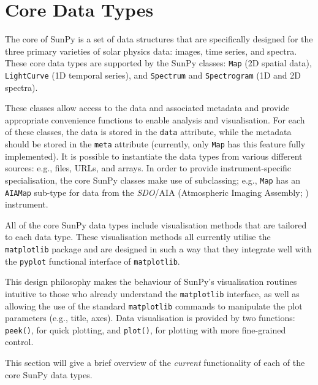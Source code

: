 \section{Core Data Types}\label{sec:DataTypes}

The core of SunPy is a set of data structures that are specifically designed for the
three primary varieties of solar physics data: images, time series, and
spectra. These core data types are supported by the SunPy classes:
\texttt{Map} (2D spatial data), \texttt{LightCurve} (1D temporal series),
and \texttt{Spectrum} and \texttt{Spectrogram} (1D and 2D spectra). 

These classes allow access to the data
and associated metadata and provide appropriate convenience functions to
enable analysis and visualisation. For each of these classes, the data is
stored in the \texttt{data} attribute, while the metadata should be stored 
in the \texttt{meta} attribute (currently, only \texttt{Map} has this feature 
fully implemented). 
It is possible to instantiate the
data types from various
different sources: e.g., files, URLs, and arrays.  
In order to provide instrument-specific specialisation, the core SunPy classes 
make use of subclassing; e.g., \texttt{Map} has an \texttt{AIAMap} 
sub-type for data from the \textit{SDO}/AIA (Atmospheric Imaging Assembly; \citealt{lemen2012}) instrument. 

All of the core SunPy data types 
include visualisation methods that are tailored to each data type. 
These visualisation methods all currently utilise the \texttt{matplotlib} 
package and are designed in such a way that they integrate well with 
the \texttt{pyplot} functional interface of \texttt{matplotlib}.

This design philosophy makes the behaviour of SunPy's visualisation 
routines intuitive to those who already understand the \texttt{matplotlib}
interface, as well as allowing the use of the standard 
\texttt{matplotlib} commands to manipulate the plot parameters (e.g., title, axes).
Data visualisation is provided by two functions: \texttt{peek()}, for quick 
plotting, and \texttt{plot()}, for plotting with more fine-grained control.

This section will give a brief overview of the \textit{current} functionality 
of each of the core SunPy data types.




